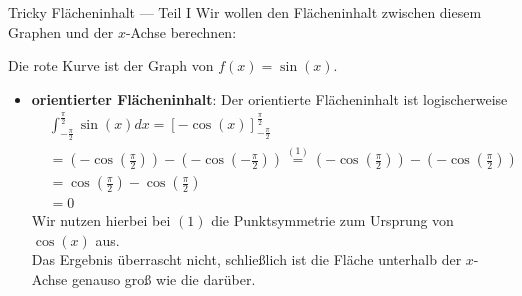 \begin{bla}{Tricky Flächeninhalt --- Teil I}
  Wir wollen den Flächeninhalt zwischen diesem Graphen und der $x$-Achse berechnen:

  \begin{marginfigure}
    \caption{Der Flächeninhalt der grünen Fläche soll berechnet werden.}
  \end{marginfigure}

  Die rote Kurve ist der Graph von $f(x)=\sin(x)$. \\
  \begin{itemize}
    \item \textbf{orientierter Flächeninhalt}: Der orientierte Flächeninhalt ist logischerweise
    \begin{equation*}
      \begin{split}
        & \int_{-\frac{\pi}{2}}^{\frac{\pi}{2}} \sin(x)dx = {[-\cos(x)]}_{-\frac{\pi}{2}}^{\frac{\pi}{2}} \\
          &= \left( -\cos \left( \frac{\pi}{2} \right) \right) - \left( -\cos \left( -\frac{\pi}{2} \right) \right)
          \stackrel{(1)}{=} \left( -\cos \left( \frac{\pi}{2} \right) \right) - \left( -\cos \left( \frac{\pi}{2} \right) \right) \\
          &= \cos \left( \frac{\pi}{2} \right) - \cos \left( \frac{\pi}{2} \right) \\
          &= 0
      \end{split}
    \end{equation*}
    Wir nutzen hierbei bei $(1)$ die Punktsymmetrie zum Ursprung von $\cos(x)$ aus. \\
    Das Ergebnis überrascht nicht, schließlich ist die Fläche unterhalb der $x$-Achse genauso groß wie die darüber.


\end{itemize}
\end{bla}
